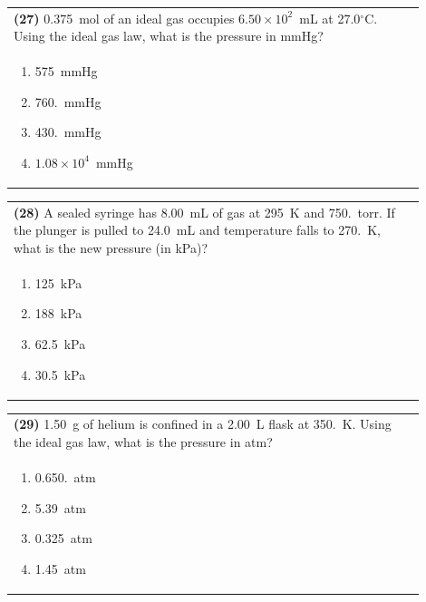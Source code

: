 \documentclass{article}
\begin{document}
\vspace{0.2cm}
\noindent\begin{tabular}{|p{0.9\linewidth}|}
\hline
\textbf{(27)} 0.375~mol of an ideal gas occupies $6.50\times10^{2}$~mL at 27.0$^\circ$C. Using the ideal gas law, what is the pressure in mmHg? \\[0.2cm]

\begin{minipage}[t]{0.85\linewidth}
\begin{enumerate}[label=\alph*.]
\item 575~mmHg
\item 760.~mmHg
\item 430.~mmHg
\item $1.08\times10^{4}$~mmHg
\end{enumerate}
\end{minipage}\\[0.2cm]
\hline
\end{tabular}

\vspace{0.2cm}
\noindent\begin{tabular}{|p{0.9\linewidth}|}
\hline
\textbf{(28)} A sealed syringe has 8.00~mL of gas at 295~K and 750.~torr. If the plunger is pulled to 24.0~mL and temperature falls to 270.~K, what is the new pressure (in kPa)?\\[0.2cm]

\begin{minipage}[t]{0.85\linewidth}
\begin{enumerate}[label=\alph*.]
\item 125~kPa
\item 188~kPa
\item 62.5~kPa
\item 30.5~kPa
\end{enumerate}
\end{minipage}\\[0.2cm]
\hline
\end{tabular}

\newpage

\noindent\begin{tabular}{|p{0.9\linewidth}|}
\hline
\textbf{(29)} 1.50~g of helium is confined in a 2.00~L flask at 350.~K. Using the ideal gas law, what is the pressure in atm? \\[0.2cm]

\begin{minipage}[t]{0.85\linewidth}
\begin{enumerate}[label=\alph*.]
\item 0.650.~atm
\item 5.39~atm
\item 0.325~atm
\item 1.45~atm
\end{enumerate}
\end{minipage}\\[0.2cm]
\hline
\end{tabular}
\end{document}
